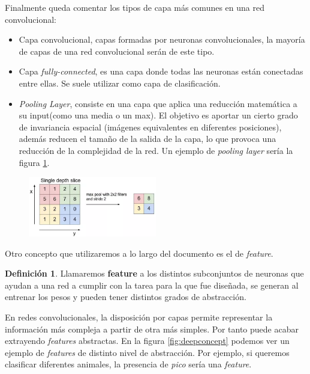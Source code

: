 \documentclass[12,twoside]{TFG-GM}
\theoremstyle{definition}
\newtheorem{definition}[theorem]{Definición}
\theoremstyle{remark}
\begin{document}
Finalmente queda comentar los tipos de capa más comunes en una red convolucional: 
\begin{itemize}
\item Capa convolucional, capas formadas por neuronas convolucionales, la mayoría de capas de una red convolucional serán de este tipo.
\item Capa \textit{fully-connected}, es una capa donde todas las neuronas están conectadas entre ellas. Se suele utilizar como capa de clasificación. 
\item \textit{Pooling Layer}, consiste en una capa que aplica una reducción matemática a su input(como una media o un max). El objetivo es aportar un cierto grado de invariancia espacial (imágenes equivalentes en diferentes posiciones), además reducen el tamaño de la salida de la capa, lo que provoca una reducción de la complejidad de la red. Un ejemplo de \textit{pooling layer} sería la figura \ref{fig:pooling}.
\end{itemize}

\begin{figure}[h]
\centering
\includegraphics[width = 0.5\textwidth]{Images/pooling1.png} 
\caption{ \label{fig:pooling}}
\end{figure}

Otro concepto que utilizaremos a lo largo del documento es el de \textit{feature}.

\begin{definition}
Llamaremos \textbf{feature} a los distintos subconjuntos de neuronas que ayudan a una red a cumplir con la tarea para la que fue diseñada, se generan al entrenar los pesos y pueden tener distintos grados de abstracción. 
\end{definition}

En redes convolucionales, la disposición por capas permite representar la información más compleja a partir de otra más simples. Por tanto puede acabar extrayendo \textit{features} abstractas. En la figura \ref{fig:deepconcept} podemos ver un ejemplo de \textit{features} de distinto nivel de abstracción. Por ejemplo, si queremos clasificar diferentes animales, la presencia de \textit{pico} sería una \textit{feature}. 
\end{document}
